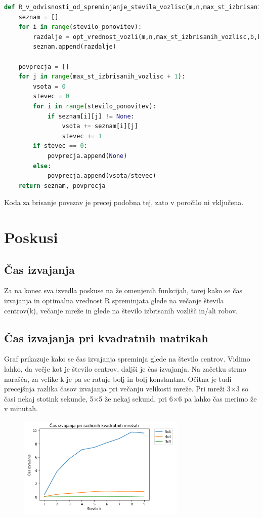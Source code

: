 \documentclass[a4paper]{article}
\begin{document}
\begin{lstlisting}[language=Python]
def R_v_odvisnosti_od_spreminjanje_stevila_vozlisc(m,n,max_st_izbrisanih_vozlisc,b,k,stevilo_ponovitev):
    seznam = []
    for i in range(stevilo_ponovitev):
        razdalje = opt_vrednost_vozli(m,n,max_st_izbrisanih_vozlisc,b,k)
        seznam.append(razdalje)

    povprecja = []
    for j in range(max_st_izbrisanih_vozlisc + 1):
        vsota = 0
        stevec = 0
        for i in range(stevilo_ponovitev):
            if seznam[i][j] != None:
                vsota += seznam[i][j]
                stevec += 1
        if stevec == 0:
            povprecja.append(None)
        else:
            povprecja.append(vsota/stevec)
    return seznam, povprecja
\end{lstlisting}

Koda za brisanje povezav je precej podobna tej, zato v poročilo ni vključena.

\section{Poskusi}
\subsection{Čas izvajanja}
Za na konec sva izvedla poskuse na že omenjenih funkcijah, torej kako se čas izvajanja in optimalna vrednost R spreminjata glede na večanje števila centrov(k), večanje mreže in glede na število izbrisanih vozlišč in/ali robov.\\

\subsection{Čas izvajanja pri kvadratnih matrikah}
Graf prikazuje kako se čas izvajanja spreminja glede na število centrov. Vidimo lahko, da večje kot je število centrov, daljši je čas izvajanja. Na začetku strmo narašča, za velike k-je pa se ratuje bolj in bolj konstantna. Očitna je tudi precejšnja razlika časov izvajanja pri večanju velikosti mreže. Pri mreži 3$\times$3 so časi nekaj stotink sekunde, 5$\times$5 že nekaj sekund, pri 6$\times$6 pa lahko čas merimo že v minutah.

\begin{figure}[h]
  \centering
  \includegraphics[width= 8cm]{cas_kvadratne_mreze}
\end{figure}
\break
\end{document}
